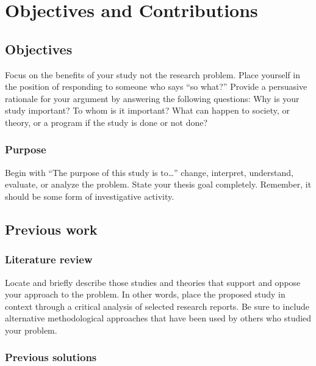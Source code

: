 \chapter{Objectives and Contributions}
\section{Objectives}
Focus on the benefits of your study not the research problem.
Place yourself in the position of responding to someone who says “so what?” Provide a persuasive rationale for your argument by answering the following questions: Why is your study important? To whom is it important? What can happen to society, or theory, or a program if the study is done or not done?

\subsection{Purpose}
Begin with “The purpose of this study is to…” change, interpret, understand, evaluate, or analyze the problem.
State your thesis goal completely. Remember, it should be some form of investigative activity.

\section{Previous work}

\subsection{Literature review}
Locate and briefly describe those studies and theories that support and oppose your approach to the problem. In other words, place the proposed study in context through a critical analysis of selected research reports.
Be sure to include alternative methodological approaches that have been used by others who studied your problem.

\subsection{Previous solutions}
